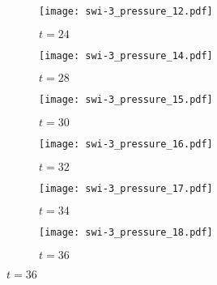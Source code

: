 \begin{figure}[t]
  \centering
    \begin{subfigure}{0.32\textwidth}
      \texttt{[image: swi-3\_pressure\_12.pdf]}
      \caption{$t=24$}
      \label{fig:swi-3_pressure_12}
    \end{subfigure}
    \hfill
    \begin{subfigure}{0.32\textwidth}
      \texttt{[image: swi-3\_pressure\_14.pdf]}
      \caption{$t=28$}
      \label{fig:swi-3_pressure_14}
    \end{subfigure}
    \hfill
    \begin{subfigure}{0.32\textwidth}
      \texttt{[image: swi-3\_pressure\_15.pdf]}
      \caption{$t=30$}
      \label{fig:swi-3_pressure_15}
    \end{subfigure}
    \hfill
    \begin{subfigure}{0.32\textwidth}
      \texttt{[image: swi-3\_pressure\_16.pdf]}
      \caption{$t=32$}
      \label{fig:swi-3_pressure_16}
    \end{subfigure}
    \hfill
    \begin{subfigure}{0.32\textwidth}
      \texttt{[image: swi-3\_pressure\_17.pdf]}
      \caption{$t=34$}
      \label{fig:swi-3_pressure_17}
    \end{subfigure}
    \hfill
    \begin{subfigure}{0.32\textwidth}
      \texttt{[image: swi-3\_pressure\_18.pdf]}
      \caption{$t=36$}
      \label{fig:swi-3_pressure_18}
    \end{subfigure}
\label{fig:kink_pressure_slices-3}%
\end{figure}

